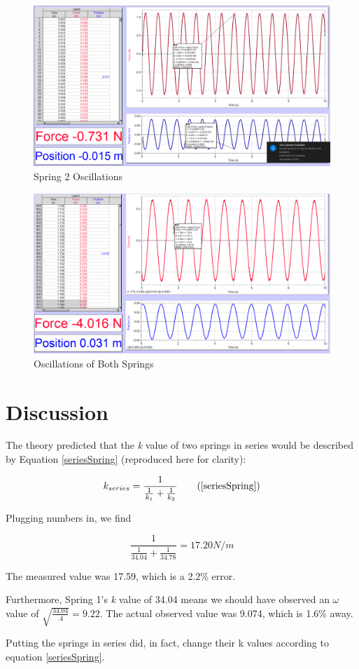 \documentclass[]{article}
\begin{document}
\begin{figure}[H]
	\centering
	\includegraphics[width=\textwidth]{res/oscillations_spring_2}
	\caption{Spring 2 Oscillations}
	\label{fig:Spring 2 Oscillations}
\end{figure}

\begin{figure}[H]
	\centering
	\includegraphics[width=\textwidth]{res/oscillations_both_springs}
	\caption{Oscillations of Both Springs}
	\label{fig:Oscillations of Both Springs}
\end{figure}

\section{Discussion}
The theory predicted that the \textit{k} value of two springs in series would be described by Equation \ref{seriesSpring} (reproduced here for clarity):

\begin{equation*}
k_{series}=\frac{1}{\frac{1}{k_1} + \frac{1}{k_2}} \tag{\ref{seriesSpring}}
\end{equation*}

Plugging numbers in, we find 

\begin{equation}
\frac{1}{\frac{1}{34.04}+\frac{1}{34.78}} = 17.20 N/m
\end{equation}

The measured value was 17.59, which is a 2.2\% error.

Furthermore, Spring 1's \textit{k} value of 34.04 means we should have observed an $\omega $ value of $\sqrt{\frac{34.04}{.4}} = 9.22$. The actual observed value was 9.074, which is 1.6\% away.

Putting the springs in series did, in fact, change their k values according to equation \ref{seriesSpring}.
\end{document}
